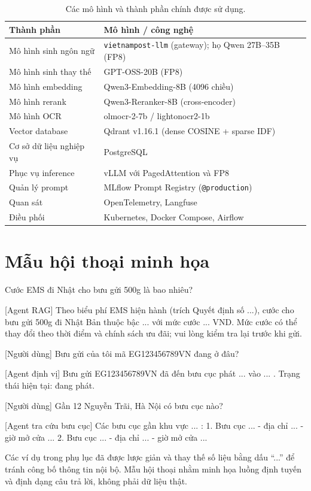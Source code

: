 \begin{table}[htbp]
\centering
\caption{Các mô hình và thành phần chính được sử dụng.}
\label{tab:app-models}
\small
\begin{tabular}{@{}p{5.2cm}p{9.2cm}@{}}
\toprule
\textbf{Thành phần} & \textbf{Mô hình / công nghệ} \\
\midrule
Mô hình sinh ngôn ngữ & \texttt{vietnampost-llm} (gateway); họ Qwen 27B--35B (FP8) \\
Mô hình sinh thay thế & GPT-OSS-20B (FP8) \\
Mô hình embedding & Qwen3-Embedding-8B (4096 chiều) \\
Mô hình rerank & Qwen3-Reranker-8B (cross-encoder) \\
Mô hình OCR & olmocr-2-7b / lightonocr2-1b \\
Vector database & Qdrant v1.16.1 (dense COSINE + sparse IDF) \\
Cơ sở dữ liệu nghiệp vụ & PostgreSQL \\
Phục vụ inference & vLLM với PagedAttention và FP8 \\
Quản lý prompt & MLflow Prompt Registry (\texttt{@production}) \\
Quan sát & OpenTelemetry, Langfuse \\
Điều phối & Kubernetes, Docker Compose, Airflow \\
\bottomrule
\end{tabular}
\end{table}

\chapter{Mẫu hội thoại minh họa}
\label{app:chat}

\begin{prompt}
 Cước EMS đi Nhật cho bưu gửi 500g là bao nhiêu?

[Agent RAG] Theo biểu phí EMS hiện hành (trích Quyết định số ...), cước
cho bưu gửi 500g đi Nhật Bản thuộc bậc ... với mức cước ... VND.
Mức cước có thể thay đổi theo thời điểm và chính sách ưu đãi; vui lòng
kiểm tra lại trước khi gửi.

[Người dùng] Bưu gửi của tôi mã EG123456789VN đang ở đâu?

[Agent định vị] Bưu gửi EG123456789VN đã đến bưu cục phát ... vào
... . Trạng thái hiện tại: đang phát.

[Người dùng] Gần 12 Nguyễn Trãi, Hà Nội có bưu cục nào?

[Agent tra cứu bưu cục] Các bưu cục gần khu vực ... :
1. Bưu cục ... - địa chỉ ... - giờ mở cửa ...
2. Bưu cục ... - địa chỉ ... - giờ mở cửa ...
\end{prompt}

\begin{ghichu}
Các ví dụ trong phụ lục đã được lược giản và thay thế số liệu bằng dấu ``...'' để tránh
công bố thông tin nội bộ. Mẫu hội thoại nhằm minh họa luồng định tuyến và định dạng câu
trả lời, không phải dữ liệu thật.
\end{ghichu}

